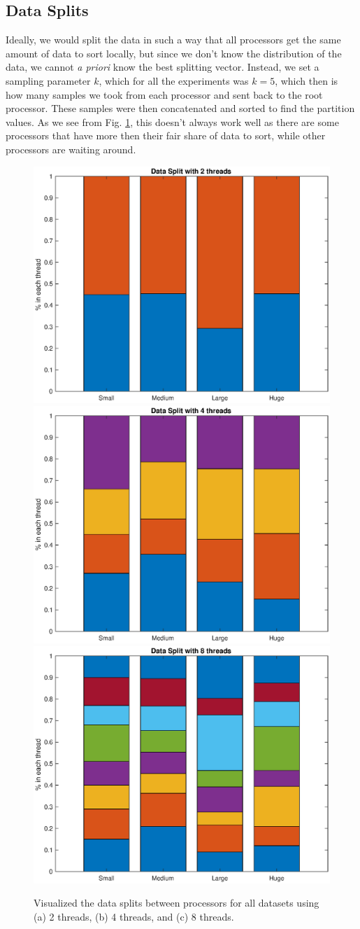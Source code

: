 \documentclass[a4paper,12pt]{article}
\theoremstyle{definition}
\theoremstyle{remark}
\begin{document}
	
	\subsection{Data Splits}
	Ideally, we would split the data in such a way that all processors get the same amount of data to sort locally, but since we don't know the distribution of the data, we cannot \textit{a priori} know the best splitting vector. Instead, we set a sampling parameter $k$, which for all the experiments was $k=5$, which then is how many samples we took from each processor and sent back to the root processor. These samples were then concatenated and sorted to find the partition values. As we see from Fig. \ref{fig:Split}, this doesn't always work well as there are some processors that have more then their fair share of data to sort, while other processors are waiting around.
	\begin{figure}[h]
	\centering
	\includegraphics[width=0.45\linewidth]{dataSplits2}
	\includegraphics[width=0.45\linewidth]{dataSplits4}
	\includegraphics[width=0.45\linewidth]{dataSplits8}
	\caption{Visualized the data splits between processors for all datasets using (a) 2 threads, (b) 4 threads, and (c) 8 threads.}
	\label{fig:Split}
	\end{figure}
	
\end{document}
